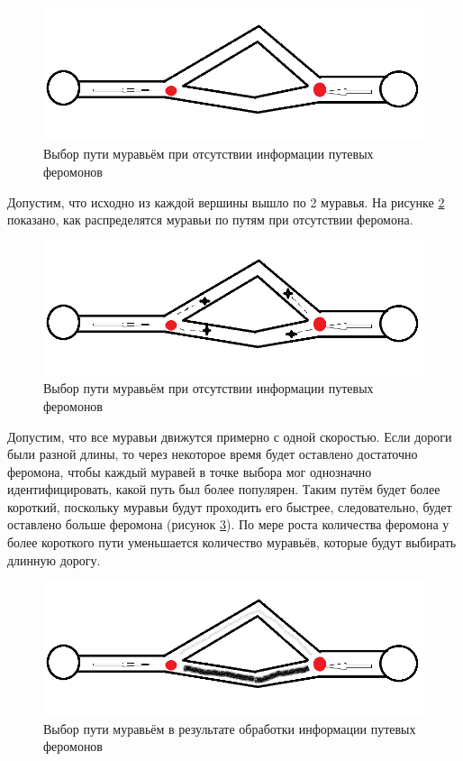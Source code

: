 \documentclass[../main.tex]{subfiles}
\begin{document}
	\begin{figure}[H]
		\centering
		\includegraphics[width=\linewidth]{src/img/1.png}
		\caption{Выбор пути муравьём при отсутствии информации путевых феромонов}
		\label{graph2.1}
	\end{figure}
	
	Допустим, что исходно из каждой вершины вышло по 2 муравья. На рисунке \ref{graph2.2} показано, как распределятся муравьи по путям при отсутствии феромона.
	
	\begin{figure}[H]
		\centering
		\includegraphics[width=0.7\linewidth]{src/img/2.png}
		\caption{Выбор пути муравьём при отсутствии информации путевых феромонов}
		\label{graph2.2}
	\end{figure}

	Допустим, что все муравьи движутся примерно с одной скоростью. 
	Если дороги были разной длины, то через некоторое время будет оставлено достаточно феромона, чтобы каждый муравей в точке выбора мог однозначно идентифицировать, какой путь был более популярен.
	Таким путём будет более короткий, поскольку муравьи будут проходить его быстрее, следовательно, будет оставлено больше феромона (рисунок \ref{graph2.3}). По мере роста количества феромона у более короткого пути уменьшается количество муравьёв, которые будут выбирать длинную дорогу. 
	
	\begin{figure}[H]
		\centering
		\includegraphics[width=0.7\linewidth]{src/img/3.png}
		\caption{Выбор пути муравьём в результате обработки информации путевых феромонов}
		\label{graph2.3}
	\end{figure}
\end{document}
